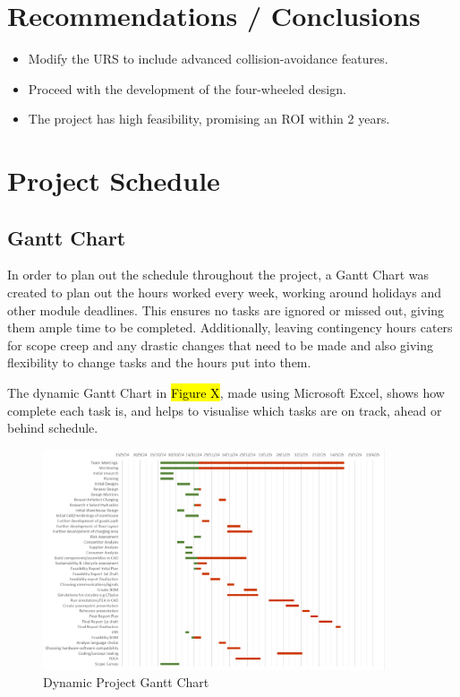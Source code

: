\documentclass[12pt]{article}
\begin{document}
\section{Recommendations / Conclusions}
\begin{itemize}
    \item Modify the URS to include advanced collision-avoidance features.
    \item Proceed with the development of the four-wheeled design.
    \item The project has high feasibility, promising an ROI within 2 years.
\end{itemize}


\section{Project Schedule}
\subsection{Gantt Chart}
In order to plan out the schedule throughout the project, a Gantt Chart was created to plan out the hours worked every week, working around holidays and other module deadlines. This ensures no tasks are ignored or missed out, giving them ample time to be completed. Additionally, leaving contingency hours caters for scope creep and any drastic changes that need to be made and also giving flexibility to change tasks and the hours put into them. 

    The dynamic Gantt Chart in \hl{Figure X}, made using Microsoft Excel, shows how complete each task is, and helps to visualise which tasks are on track, ahead or behind schedule. 
\begin{figure}[h!]
    \centering
    \includegraphics[width=0.9\textwidth]{dynamicganttchart.png}
    \caption{Dynamic Project Gantt Chart}
    \label{fig:x}
\end{figure}
\end{document}
